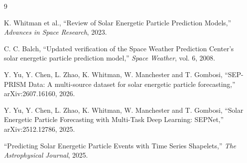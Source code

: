 \documentclass[11pt]{article}
\begin{document}
\begin{thebibliography}{9}

K. Whitman et al.,
``Review of Solar Energetic Particle Prediction Models,''
\emph{Advances in Space Research}, 2023.

C. C. Balch,
``Updated verification of the Space Weather Prediction Center's solar energetic particle prediction model,''
\emph{Space Weather}, vol. 6, 2008.

Y. Yu, Y. Chen, L. Zhao, K. Whitman, W. Manchester and T. Gombosi,
``SEP-PRISM Data: A multi-source dataset for solar energetic particle forecasting,''
arXiv:2607.16160, 2026.

Y. Yu, Y. Chen, L. Zhao, K. Whitman, W. Manchester and T. Gombosi,
``Solar Energetic Particle Forecasting with Multi-Task Deep Learning: SEPNet,''
arXiv:2512.12786, 2025.

``Predicting Solar Energetic Particle Events with Time Series Shapelets,''
\emph{The Astrophysical Journal}, 2025.

\end{thebibliography}
\end{document}
